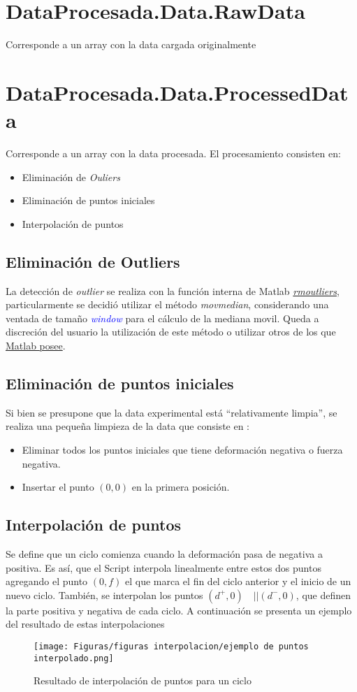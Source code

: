 \documentclass[a4paper, 11pt,article,oneside]{memoir}%
\begin{document}
\section{DataProcesada.Data.RawData}
 Corresponde a un array con la data cargada originalmente
\section{DataProcesada.Data.ProcessedData}
Corresponde a un array con la data procesada. El procesamiento consisten en: 
\begin{itemize}
    \item Eliminación de \textit{Ouliers}
    \item Eliminación de puntos iniciales
    \item Interpolación de puntos
\end{itemize}
\subsection{Eliminación de Outliers}
La detección de \textit{outlier} se realiza con la función interna de Matlab \href{https://www.mathworks.com/help/matlab/ref/rmoutliers.html?s_tid=doc_ta}{\textit{rmoutliers}}, particularmente se decidió utilizar el método  \textit{movmedian}, considerando una ventada de tamaño \textit{\textcolor{blue}{window}} para el cálculo de la mediana movil.
Queda a discreción del usuario la utilización de este método o  utilizar otros de los que \href{https://www.mathworks.com/help/matlab/ref/cleanoutlierdata.html}{Matlab posee}. 
\subsection{Eliminación de puntos iniciales}
Si bien se presupone que la data experimental está ``relativamente limpia'', se realiza una pequeña limpieza de la data que consiste en :
\begin{itemize}
\item Eliminar todos los puntos iniciales que tiene deformación negativa o fuerza negativa. 
\item Insertar el punto $(0,0)$ en la primera posición.
\end{itemize}
\subsection{Interpolación de puntos}\label{subsec: interp}
Se define que un ciclo comienza cuando la deformación pasa de negativa a positiva. Es así, que el Script interpola linealmente entre estos dos puntos agregando el punto $(0,f)$ el que marca el fin del ciclo anterior y el inicio de un nuevo ciclo. También, se interpolan los puntos $(d^+,0) \quad || (d^-,0)$, que definen la parte positiva y negativa de cada ciclo.
    A continuación se presenta un ejemplo del resultado de estas interpolaciones
     \begin{figure} [H]
    \centering
    \texttt{[image: Figuras/figuras interpolacion/ejemplo de puntos interpolado.png]}
    \caption{\label{interp result} Resultado de interpolación de puntos para un ciclo}
    \end{figure}
\newpage
\end{document}
